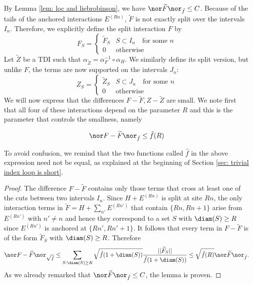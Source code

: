 By Lemma \ref{lem: loc and liebrobinson}, we have $\nor\widetilde F\nor_{\hat{f}}\leq C$.
Because of the tails of the anchored interactions $E^{(Rn)}$, $\widetilde F$ is not exactly split over the intervals $I_n$.
Therefore, we explicitly define the split interaction $F$ by
$$
F_S=\begin{cases}  \widetilde F_S & S \subset I_n \quad \text{for some $n$} \\
0  & \text{otherwise}
\end{cases}
$$
Let $\widetilde Z$ be a TDI 
such that  $\alpha_{\widetilde Z}=\alpha_{F}^{-1} \circ \alpha_H$. We similarly define its split version, but unlike $F$, the terms are now supported on the intervals $J_n$:
$$
Z_S=\begin{cases}  \widetilde Z_S & S \subset J_n \quad \text{for some $n$} \\
0  & \text{otherwise}
\end{cases}
$$
We will now express that the differences $F-\widetilde F, Z-\widetilde Z$ are small. We note first that all four of these interactions depend on the parameter $R$ and this is the parameter that controls the smallness, namely
\begin{lemma}\label{lem: small difference f}
	$$
	\nor F-\widetilde F\nor_{\hat{f}} \leq \hat{f}(R)
	$$
\end{lemma}
\noindent To avoid confusion, we remind that the two functions called $\hat{f}$ in the above expression need not be equal,  as explained at the beginning of Section \ref{sec: trivial index loop is short}.
\begin{proof} 
	The difference $F-\widetilde F$ contains only those terms that cross at least one of the cuts between two intervals $I_n$. Since $H+E^{(Rn)}$ is split at site $Rn$, the only interaction terms in $\widetilde F=H+\sum_{n'} E^{(Rn')}$ that contain $\{Rn,Rn+1\}$ arise from $ E^{(Rn')}$ with $n' \neq n$ and hence they correspond to a set $S$ with $\diam(S)\geq R$ since $ E^{(Rn')}$ is anchored at $\{Rn',Rn'+1\}$. It follows that every term in $F-\widetilde F$ is of the form $\widetilde F_S$  with  $\diam(S)\geq R$.  Therefore
	$$\nor F-\widetilde F\nor_{\sqrt{\hat{f}}} \leq \sum_{S:\diam(S)\geq R}\sqrt{\hat f(1+\diam(S))}\frac{||\widetilde F_S||}{\hat f(1+\diam(S))}
	\leq \sqrt{\hat{f}(R)}  \nor \widetilde F \nor_{\hat{f}}. $$
	As we already remarked that $\nor \widetilde F \nor_{\hat{f}}\leq C$, the lemma is proven.
\end{proof}


